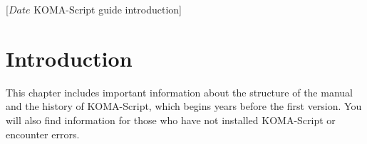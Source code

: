 %
%
%
%
%
%
%
%
% 
%
%
%
%

                 [$Date$
                  KOMA-Script guide introduction]


\chapter{Introduction}

This chapter includes important information about the structure of the manual
and the history of KOMA-Script, which begins years before the first
version. You will also find information for those who have not installed
KOMA-Script or encounter errors.

